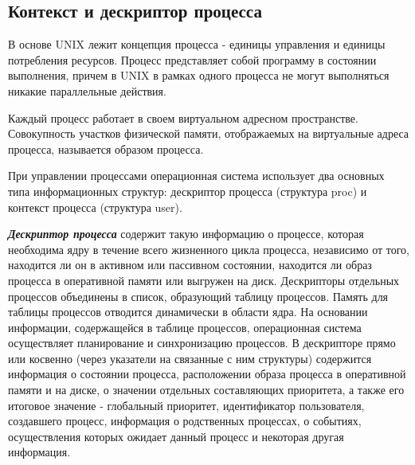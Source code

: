 \subsection{Контекст и дескриптор процесса}
В основе UNIX лежит концепция процесса - единицы управления и единицы потребления ресурсов. Процесс представляет собой программу в состоянии выполнения, причем в UNIX в рамках одного процесса не могут выполняться никакие параллельные действия.

Каждый процесс работает в своем виртуальном адресном пространстве. Совокупность участков физической памяти, отображаемых на виртуальные адреса процесса, называется образом процесса.

При управлении процессами операционная система использует два основных типа информационных структур: дескриптор процесса (структура proc) и контекст процесса (структура user).

\textbf{\textit{Дескриптор процесса}} содержит такую информацию о процессе, которая необходима ядру в течение всего жизненного цикла процесса, независимо от того, находится ли он в активном или пассивном состоянии, находится ли образ процесса в оперативной памяти или выгружен на диск. Дескрипторы отдельных процессов объединены в список, образующий таблицу процессов. Память для таблицы процессов отводится динамически в области ядра. На основании информации, содержащейся в таблице процессов, операционная система осуществляет планирование и синхронизацию процессов. В дескрипторе прямо или косвенно (через указатели на связанные с ним структуры) содержится информация о состоянии процесса, расположении образа процесса в оперативной памяти и на диске, о значении отдельных составляющих приоритета, а также его итоговое значение - глобальный приоритет, идентификатор пользователя, создавшего процесс, информация о родственных процессах, о событиях, осуществления которых ожидает данный процесс и некоторая другая информация.


